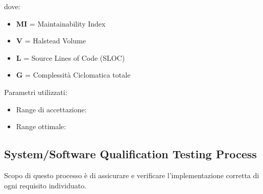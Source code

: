 \documentclass[a4paper,11pt]{article}
\begin{document}
dove: 
\begin{itemize}
\item \textbf{MI} = Maintainability Index
\item \textbf{V} = Halstead Volume
\item \textbf{L} = Source Lines of Code (SLOC)
\item \textbf{G} = Complessità Ciclomatica totale
\end{itemize}
Parametri utilizzati: 
\begin{itemize}
	\item Range di accettazione: \begin{math}[20 - 100]\end{math}
	\item Range ottimale: \begin{math}[70 - 100]\end{math}
	\end{itemize}

%

\subsection{System/Software Qualification Testing Process}
Scopo di questo processo è di assicurare e verificare l'implementazione corretta di ogni requisito individuato.
\end{document}
